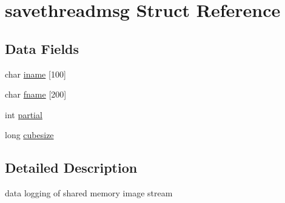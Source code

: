 \hypertarget{structsavethreadmsg}{\section{savethreadmsg Struct Reference}
\label{structsavethreadmsg}
}
\subsection*{Data Fields}
\begin{DoxyCompactItemize}
\item 
char \hyperlink{structsavethreadmsg_acd2174c7310a13ba8b782fe91b6bc3ab}{iname} \mbox{[}100\mbox{]}
\item 
char \hyperlink{structsavethreadmsg_a86ce40d969ce095eb8ee5360b3298e8e}{fname} \mbox{[}200\mbox{]}
\item 
int \hyperlink{structsavethreadmsg_a67b95feb0e172459de37d4e23fab693b}{partial}
\item 
long \hyperlink{structsavethreadmsg_aabe32dc91c33ab3536ad6d2b6730159f}{cubesize}
\end{DoxyCompactItemize}


\subsection{Detailed Description}
data logging of shared memory image stream 

